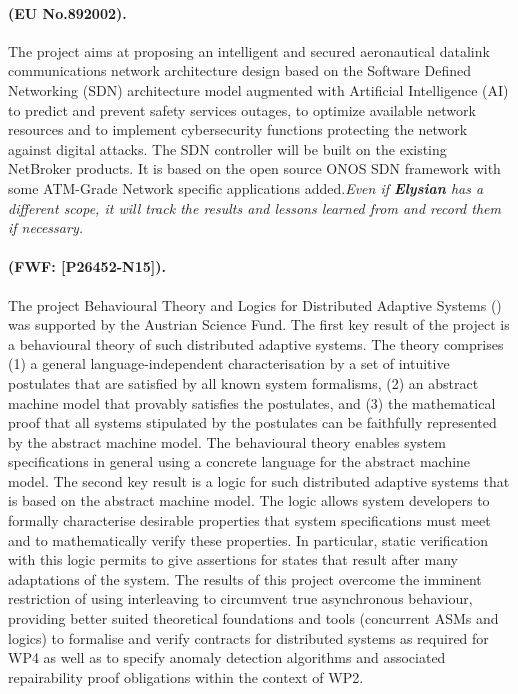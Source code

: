 \documentclass[a4paper,11pt]{article}
\newcommand{\project}[1]{\textbf{#1}\xspace}
\newcommand{\SECURITY}{\project{Elysian}}
\newcommand{\TheProject}{\SECURITY}
\begin{document}
\begin{mdframed}[backgroundcolor=blue!5]
\paragraph{\sinapse (EU No.892002).}
 The \sinapse project aims at proposing an intelligent and secured aeronautical datalink communications network architecture design based on the Software Defined Networking (SDN) architecture model augmented with Artificial Intelligence (AI) to predict and prevent safety services outages, to optimize available network resources and to implement cybersecurity functions protecting the network against digital attacks. The SDN controller will be built on the existing \FRQshort{} NetBroker products. It is based on the open source ONOS SDN framework with some ATM-Grade Network specific applications added.\emph{Even if \TheProject has a different scope, it will track the results and lessons learned from \sinapse and record them if necessary.}
\end{mdframed}

\begin{mdframed}[backgroundcolor=blue!5]
\paragraph{\blogdas (FWF: [P26452-N15]).} 
The project Behavioural Theory and Logics for Distributed Adaptive Systems (\blogdas) was supported by the Austrian Science Fund. The first key result of the project is a behavioural theory of such distributed adaptive systems. The theory comprises (1) a general language-independent characterisation by a set of intuitive postulates that are satisfied by all known system formalisms, (2) an abstract machine model that provably satisfies the postulates, and (3) the mathematical proof that all systems stipulated by the postulates can be faithfully represented by the abstract machine model. The behavioural theory enables system specifications in general using a concrete language for the abstract machine model. The second key result is a logic for such distributed adaptive systems that is based on the abstract machine model. The logic allows system developers to formally characterise desirable properties that system specifications must meet and to mathematically verify these properties. In particular, static verification with this logic permits to give assertions for states that result after many adaptations of the system.
The results of this project overcome the imminent restriction of using interleaving to circumvent true asynchronous behaviour, providing better suited theoretical foundations and tools (concurrent ASMs and logics) to formalise and verify contracts for distributed systems as required for WP4 as well as to specify anomaly detection algorithms and associated repairability proof obligations within the context of WP2.  
\end{mdframed}
\end{document}
